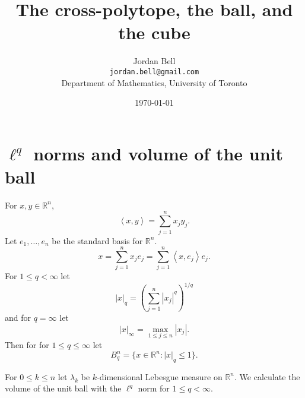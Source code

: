 \documentclass{article}
\newcommand{\inner}[2]{\left\langle #1, #2 \right\rangle}
\theoremstyle{definition}
\begin{document}
\title{The cross-polytope, the ball, and the cube}
\author{Jordan Bell\\ \texttt{jordan.bell@gmail.com}\\Department of Mathematics, University of Toronto}
\date{\today}

\maketitle

\section{$\ell^q$ norms and volume of the unit ball}
For $x,y \in \mathbb{R}^n$,
\[
\inner{x}{y} = \sum_{j=1}^n x_j y_j.
\]
Let $e_1,\ldots,e_n$ be the standard basis for $\mathbb{R}^n$. 
\[
x = \sum_{j=1}^n x_j e_j = \sum_{j=1}^n \inner{x}{e_j} e_j.
\]
For $1 \leq q < \infty$ let
\[
|x|_q = \left( \sum_{j=1}^n |x_j|^q \right)^{1/q}
\]
and for $q=\infty$ let
\[
|x|_\infty = \max_{1 \leq j \leq n} |x_j|.
\]
Then for
for $1 \leq  q \leq \infty$ let
\[
B_q^n = \{x \in \mathbb{R}^n: |x|_q \leq 1\}.
\]

For $0 \leq k \leq n$ let $\lambda_k$ be $k$-dimensional Lebesgue measure on $\mathbb{R}^n$.
We calculate the volume of the unit ball with the $\ell^q$ norm for $1 \leq q<\infty$.
\end{document}
